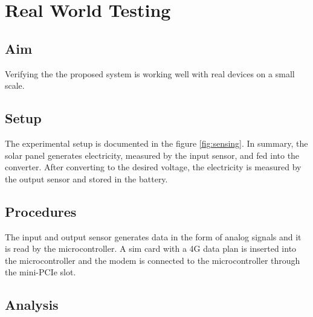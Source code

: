 \documentclass[../thesis.tex]{subfiles}
\begin{document}
\chapter{Real World Testing}

\section{Aim}

Verifying the the proposed system is working well with real devices on a small scale.

\section{Setup}

The experimental setup is documented in the figure \ref{fig:sensing}. In summary, the solar panel generates electricity, measured by the input sensor, and fed into the converter. After converting to the desired voltage, the electricity is measured by the output sensor and stored in the battery. 


\section{Procedures}

The input and output sensor generates data in the form of analog signals and it is read by the microcontroller. A sim card with a 4G data plan is inserted into the microcontroller and the modem is connected to the microcontroller through the mini-PCIe slot. 

\section{Analysis}
\end{document}
